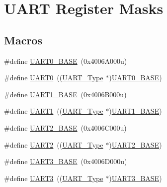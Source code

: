 \hypertarget{group___u_a_r_t___register___masks}{}\section{U\+A\+RT Register Masks}
\label{group___u_a_r_t___register___masks}
\subsection*{Macros}
\begin{DoxyCompactItemize}
\item 
\#define \mbox{\hyperlink{group___u_a_r_t___register___masks_ga7a07348b4332ff6b88abf6092347deba}{U\+A\+R\+T0\+\_\+\+B\+A\+SE}}~(0x4006\+A000u)
\item 
\#define \mbox{\hyperlink{group___u_a_r_t___register___masks_ga0508661f121639ffdee7de2353a0def2}{U\+A\+R\+T0}}~((\mbox{\hyperlink{struct_u_a_r_t___type}{U\+A\+R\+T\+\_\+\+Type}} $\ast$)\mbox{\hyperlink{group___u_a_r_t___register___masks_ga7a07348b4332ff6b88abf6092347deba}{U\+A\+R\+T0\+\_\+\+B\+A\+SE}})
\item 
\#define \mbox{\hyperlink{group___u_a_r_t___register___masks_ga383bf0c4670c3a7fa72df80f66331a46}{U\+A\+R\+T1\+\_\+\+B\+A\+SE}}~(0x4006\+B000u)
\item 
\#define \mbox{\hyperlink{group___u_a_r_t___register___masks_ga8d69bf04d07af4fbbab5a8bd291f65ff}{U\+A\+R\+T1}}~((\mbox{\hyperlink{struct_u_a_r_t___type}{U\+A\+R\+T\+\_\+\+Type}} $\ast$)\mbox{\hyperlink{group___u_a_r_t___register___masks_ga383bf0c4670c3a7fa72df80f66331a46}{U\+A\+R\+T1\+\_\+\+B\+A\+SE}})
\item 
\#define \mbox{\hyperlink{group___u_a_r_t___register___masks_gac9998d643534960b684d45a60b998421}{U\+A\+R\+T2\+\_\+\+B\+A\+SE}}~(0x4006\+C000u)
\item 
\#define \mbox{\hyperlink{group___u_a_r_t___register___masks_ga7f6bd6eb89ae2eeae97af4207ebe3cde}{U\+A\+R\+T2}}~((\mbox{\hyperlink{struct_u_a_r_t___type}{U\+A\+R\+T\+\_\+\+Type}} $\ast$)\mbox{\hyperlink{group___u_a_r_t___register___masks_gac9998d643534960b684d45a60b998421}{U\+A\+R\+T2\+\_\+\+B\+A\+SE}})
\item 
\#define \mbox{\hyperlink{group___u_a_r_t___register___masks_ga2eff3896840fdf741bd67d2d7fe99a34}{U\+A\+R\+T3\+\_\+\+B\+A\+SE}}~(0x4006\+D000u)
\item 
\#define \mbox{\hyperlink{group___u_a_r_t___register___masks_ga961726a611b38bcaf61f3d598b0a59ec}{U\+A\+R\+T3}}~((\mbox{\hyperlink{struct_u_a_r_t___type}{U\+A\+R\+T\+\_\+\+Type}} $\ast$)\mbox{\hyperlink{group___u_a_r_t___register___masks_ga2eff3896840fdf741bd67d2d7fe99a34}{U\+A\+R\+T3\+\_\+\+B\+A\+SE}})

\end{DoxyCompactItemize}
